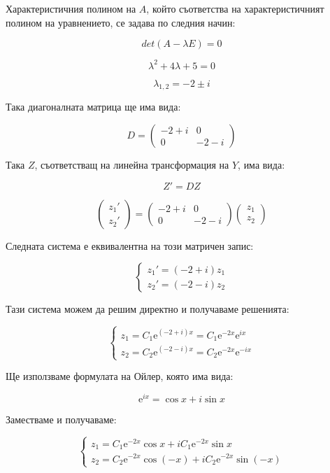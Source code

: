 \documentclass{scrartcl}
\begin{document}
Характеристичния полином на $A$, който съответства на характеристичният полином на уравнението, се задава по следния начин:

$$det(A-\lambda E) = 0$$

$$\lambda^2 + 4\lambda + 5 = 0$$

$$\lambda_{1,2} = -2\pm i$$

Така диагоналната матрица ще има вида:

$$
D =
\begin{pmatrix}
    -2+i & 0\\
    0 & -2-i
\end{pmatrix}
$$

Така $Z$, съответстващ на линейна трансформация на $Y$, има вида:

$$Z' = DZ$$

$$
\begin{pmatrix}
    z_1'\\z_2'
\end{pmatrix}
=
\begin{pmatrix}
    -2+i & 0\\
    0 & -2-i
\end{pmatrix}
\begin{pmatrix}
    z_1\\
    z_2
\end{pmatrix}
$$

Следната система е еквивалентна на този матричен запис:

$$
\begin{cases}
    z_1' = (-2+i)z_1\\
    z_2' = (-2-i)z_2
\end{cases}
$$

Тази система можем да решим директно и получаваме решенията:

$$
\begin{cases}
    z_1 = C_1\mathrm{e}^{(-2+i)x} = C_1\mathrm{e}^{-2x}\mathrm{e}^{ix}\\
    z_2 = C_2\mathrm{e}^{(-2-i)x} = C_2\mathrm{e}^{-2x}\mathrm{e}^{-ix}
\end{cases}
$$

Ще използваме формулата на Ойлер, която има вида:

$$\mathrm{e}^{ix} = \cos{x} + i\sin{x}$$

Заместваме и получаваме:

$$
\begin{cases}
    z_1 = C_1\mathrm{e}^{-2x}\cos{x} + iC_1\mathrm{e}^{-2x}\sin{x}\\
    z_2 = C_2\mathrm{e}^{-2x}\cos{(-x)} + iC_2\mathrm{e}^{-2x}\sin{(-x)}
\end{cases}
$$
\end{document}
